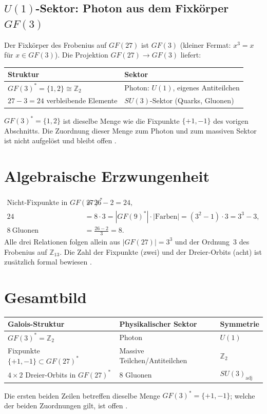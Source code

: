 \subsection{$U(1)$-Sektor: Photon aus dem Fixkörper $GF(3)$}

Der Fixkörper des Frobenius auf $GF(27)$ ist $GF(3)$ (kleiner Fermat: $x^3=x$
für $x\in GF(3)$). Die Projektion $GF(27)\to GF(3)$ liefert:

\begin{center}
\begin{tabular}{ll}
\toprule
Struktur & Sektor \\
\midrule
$GF(3)^*=\{1,2\}\cong\mathbb{Z}_2$ & Photon: $U(1)$, eigenes Antiteilchen \\
$27-3=24$ verbleibende Elemente & $SU(3)$-Sektor (Quarks, Gluonen) \\
\bottomrule
\end{tabular}
\end{center}
$GF(3)^*=\{1,2\}$ ist dieselbe Menge wie die Fixpunkte $\{+1,-1\}$ des
vorigen Abschnitts. Die Zuordnung dieser Menge zum Photon und zum massiven
Sektor ist nicht aufgelöst und bleibt offen \SM.

\section{Algebraische Erzwungenheit \BM}

\begin{align}
\text{Nicht-Fixpunkte in }GF(27)^* &= 26-2 = 24,\\
24 &= 8\cdot3 = |GF(9)^*|\cdot|\text{Farben}|
     = (3^2-1)\cdot3 = 3^3-3,\\
8\ \text{Gluonen} &= \tfrac{26-2}{3} = 8.
\end{align}
Alle drei Relationen folgen allein aus $|GF(27)|=3^3$ und der Ordnung~3 des
Frobenius auf $\mathbb{Z}_{13}$. Die Zahl der Fixpunkte (zwei) und der
Dreier-Orbits (acht) ist zusätzlich formal bewiesen \LM.

\section{Gesamtbild}

\begin{center}
\begin{tabular}{lll}
\toprule
Galois-Struktur & Physikalischer Sektor & Symmetrie \\
\midrule
$GF(3)^*=\mathbb{Z}_2$ & Photon & $U(1)$ \\
Fixpunkte $\{+1,-1\}\subset GF(27)^*$ & Massive Teilchen/Antiteilchen & $\mathbb{Z}_2$ \\
$4\times2$ Dreier-Orbits in $GF(27)^*$ & 8 Gluonen & $SU(3)_\mathrm{adj}$ \\
\bottomrule
\end{tabular}
\end{center}
Die ersten beiden Zeilen betreffen dieselbe Menge $GF(3)^*=\{+1,-1\}$; welche
der beiden Zuordnungen gilt, ist offen \SM.

